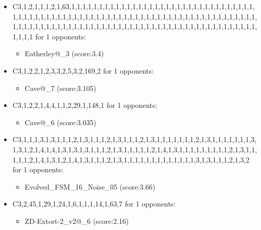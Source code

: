 \begin{appendices}
\begin{itemize}
        \item C3,1,2,1,1,1,2,1,63,1,1,1,1,1,1,1,1,1,1,1,1,1,1,1,1,1,1,1,1,1,1,1,1,1,1,1,1,1,1,1,1,1,1,1,1,1,1,1,1,1,1,1,1,1,1,1,1,1,1,1,1,1,1,1,1,1,1,1,1,1,1,1,1,1,1,1,1,1,1,1,1,1,1,1,1,1,1,1,1,1,1,1,1,1,1,1,1,1,1,1,1,1,1,1,1,1,1,1,1,1,1,1,1,1,1,1,1,1,1,1,1,1,1,1,1,1,1,1,1,1,1,1,1,1 for 1 opponents:
        \begin{multicols}{3}
            \begin{itemize}
                \item Eatherley@\_3 (score:3.4)
            \end{itemize}
        \end{multicols}

        \item C3,1,2,2,1,2,3,3,2,5,3,2,169,2 for 1 opponents:
        \begin{multicols}{3}
            \begin{itemize}
                \item Cave@\_7 (score:3.105)
            \end{itemize}
        \end{multicols}

        \item C3,1,2,2,1,4,4,1,1,2,29,1,148,1 for 1 opponents:
        \begin{multicols}{3}
            \begin{itemize}
                \item Cave@\_6 (score:3.035)
            \end{itemize}
        \end{multicols}

        \item C3,1,1,1,3,1,3,1,1,1,2,1,3,1,1,1,2,1,3,1,1,1,2,1,3,1,1,1,1,1,1,1,2,1,3,1,1,1,1,1,1,1,3,1,3,1,2,1,4,1,4,1,3,1,3,1,3,1,1,1,2,1,3,1,1,1,1,1,2,1,4,1,3,1,1,1,1,1,1,1,1,1,2,1,3,1,1,1,1,1,2,1,4,1,3,1,2,1,4,1,3,1,1,1,2,1,3,1,1,1,1,1,1,1,1,1,1,1,1,1,3,1,3,1,1,1,2,1,3,2 for 1 opponents:
        \begin{multicols}{3}
            \begin{itemize}
                \item Evolved\_FSM\_16\_Noise\_05 (score:3.66)
            \end{itemize}
        \end{multicols}

        \item C3,2,45,1,29,1,24,1,6,1,1,1,14,1,63,7 for 1 opponents:
        \begin{multicols}{3}
            \begin{itemize}
                \item ZD-Extort-2\_v2@\_6 (score:2.16)
            \end{itemize}
        \end{multicols}


\end{itemize}
\end{appendices}
